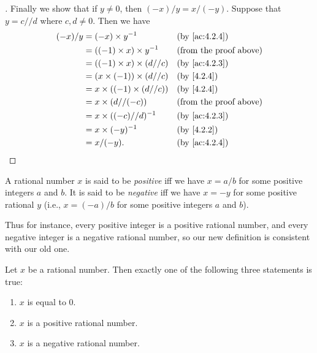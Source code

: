 \begin{proof}[]
  Finally we show that if \(y \neq 0\), then \((-x) / y = x / (-y)\).
  Suppose that \(y = c // d\) where \(c, d \neq 0\).
  Then we have
  \begin{align*}
    (-x) / y & = (-x) \times y^{-1}              &  & \by{ac:4.2.4}                 \\
             & = ((-1) \times x) \times y^{-1}   &  & \text{(from the proof above)} \\
             & = ((-1) \times x) \times (d // c) &  & \by{ac:4.2.3}                 \\
             & = (x \times (-1)) \times (d // c) &  & \by{4.2.4}                    \\
             & = x \times ((-1) \times (d // c)) &  & \by{4.2.4}                    \\
             & = x \times (d // (-c))            &  & \text{(from the proof above)} \\
             & = x \times ((-c) // d)^{-1}       &  & \by{ac:4.2.3}                 \\
             & = x \times (-y)^{-1}              &  & \by{4.2.2}                    \\
             & = x / (-y).                       &  & \by{ac:4.2.4}
  \end{align*}
\end{proof}

\begin{defn}\label{4.2.6}
  A rational number \(x\) is said to be \emph{positive} iff we have \(x = a / b\) for some positive integers \(a\) and \(b\).
  It is said to be \emph{negative} iff we have \(x = -y\) for some positive rational \(y\)
  (i.e., \(x = (-a) / b\) for some positive integers \(a\) and \(b\)).

  Thus for instance, every positive integer is a positive rational number, and every negative integer is a negative rational number, so our new definition is consistent with our old one.
\end{defn}

\begin{lem}\label{4.2.7}
  Let \(x\) be a rational number.
  Then exactly one of the following three statements is true:
  \begin{enumerate}
    \item \(x\) is equal to \(0\).
    \item \(x\) is a positive rational number.
    \item \(x\) is a negative rational number.
  \end{enumerate}
\end{lem}

